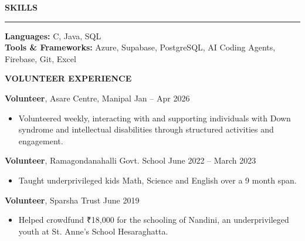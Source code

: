 \documentclass[10.5pt]{article}
\newcommand{\sectionheader}[1]{
  \vspace{4pt}
  {\color{accent}\textbf{\large #1}}
  \par\vspace{1pt}
  {\color{accent}\hrule}
  \vspace{3pt}
}
\begin{document}
\sectionheader{SKILLS}

\textbf{Languages:} C, Java, SQL \\
\textbf{Tools \& Frameworks:} Azure, Supabase, PostgreSQL, AI Coding Agents, Firebase, Git, Excel

\begin{center}
\textbf{VOLUNTEER EXPERIENCE}
\end{center}

\textbf{Volunteer}, Asare Centre, Manipal \hfill Jan -- Apr 2026 \\
\begin{itemize}[noitemsep, topsep=1pt]
\item Volunteered weekly, interacting with and supporting individuals with Down syndrome and intellectual disabilities through structured activities and engagement.
\end{itemize}

\vspace{2pt}

\textbf{Volunteer}, Ramagondanahalli Govt. School \hfill June 2022 -- March 2023 \\
\begin{itemize}[noitemsep, topsep=1pt]
\item Taught underprivileged kids Math, Science and English over a 9 month span.
\end{itemize}

\vspace{2pt}

\textbf{Volunteer}, Sparsha Trust \hfill June 2019 \\
\begin{itemize}[noitemsep, topsep=1pt]
\item Helped crowdfund ₹18,000 for the schooling of Nandini, an underprivileged youth at St. Anne's School Hesaraghatta.
\end{itemize}
\end{document}
